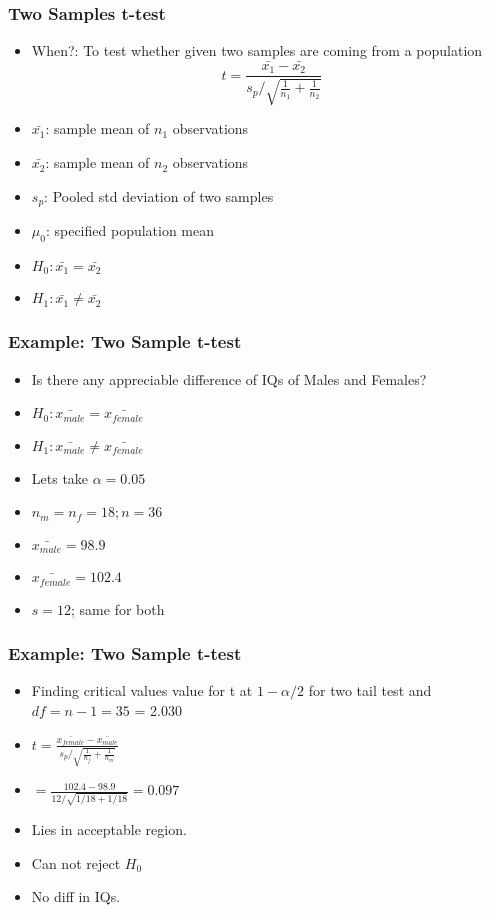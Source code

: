 \begin{frame}[fragile]\frametitle{Two Samples t-test}
\begin{itemize}
\item When?: To test whether given two samples are coming from a population
$$
t = \frac{\bar{x_1} - \bar{x_2}}{s_p /\sqrt{\frac{1}{n_1} + \frac{1}{n_2}}}
$$
\item $\bar{x_1}$: sample mean of $n_1$ observations
\item $\bar{x_2}$: sample mean of $n_2$ observations
\item $s_p$: Pooled std deviation of two samples
\item $\mu_0$: specified population mean
\item $H_0: \bar{x_1} = \bar{x_2}$
\item $H_1: \bar{x_1} \neq \bar{x_2}$
\end{itemize}
\end{frame}

\begin{frame}[fragile]\frametitle{Example: Two Sample t-test}
\begin{itemize}
\item Is there any appreciable difference of IQs of Males and Females?
\item $H_0: \bar{x_{male}} = \bar{x_{female}}$
\item $H_1: \bar{x_{male}} \neq \bar{x_{female}}$
\item Lets take $\alpha = 0.05$
\item $n_m = n_f = 18; n= 36$
\item $ \bar{x_{male}} = 98.9$
\item $ \bar{x_{female}} = 102.4 $
\item $s = 12$; same for both
\end{itemize}
\end{frame}

\begin{frame}[fragile]\frametitle{Example: Two Sample t-test}
\begin{itemize}
\item Finding critical values value for t at $1 - \alpha/2$ for two tail test and  $df = n -1 = 35$ = 2.030
\item $t = \frac{\bar{x_{female}} - \bar{x_{male}}}{s_p /\sqrt{\frac{1}{n_f} + \frac{1}{n_m}}}$
\item $ = \frac{102.4- 98.9}{12/ \sqrt{1/18 + 1/18}} = 0.097$
\item Lies in acceptable region.
\item Can not reject $H_0$
\item No diff in IQs.
\end{itemize}
\end{frame}

